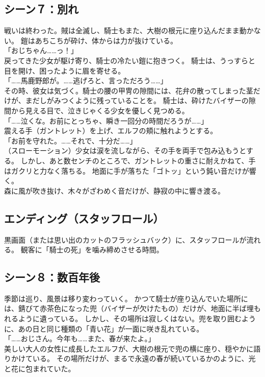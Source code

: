 \subsection{シーン７：別れ}
戦いは終わった。賊は全滅し、騎士もまた、大樹の根元に座り込んだまま動かない。
鎧はあちこちが砕け、体からは力が抜けている。
\\「おじちゃん……っ！」\\
戻ってきた少女が駆け寄り、騎士の冷たい鎧に抱きつく。
騎士は、うっすらと目を開け、困ったように眉を寄せる。
\\「……馬鹿野郎が。……逃げろと、言っただろう……」\\
その時、彼女は気づく。騎士の腰の甲冑の隙間には、花弁の散ってしまった茎だけが、まだしがみつくように残っていることを。
騎士は、砕けたバイザーの隙間から見える目で、泣きじゃくる少女を優しく見つめる。
\\「……泣くな。お前にとっちゃ、瞬き一回分の時間だろうが……」\\
震える手（ガントレット）を上げ、エルフの頬に触れようとする。
\\「お前を守れた。……それで、十分だ……」\\
（スローモーション）少女は涙を流しながら、その手を両手で包み込もうとする。
しかし、あと数センチのところで、ガントレットの重さに耐えかねて、手はガクリと力なく落ちる。
地面に手が落ちた「ゴトッ」という鈍い音だけが響く。\\
森に風が吹き抜け、木々がざわめく音だけが、静寂の中に響き渡る。

\subsection{エンディング（スタッフロール）}
黒画面（または思い出のカットのフラッシュバック）に、スタッフロールが流れる。
観客に「騎士の死」を噛み締めさせる時間。

\subsection{シーン８：数百年後}
季節は巡り、風景は移り変わっていく。
かつて騎士が座り込んでいた場所には、錆びて赤茶色になった兜（バイザーが欠けたもの）だけが、地面に半ば埋もれるように遺っている。
しかし、その場所は寂しくはない。兜を取り囲むように、あの日と同じ種類の「青い花」が一面に咲き乱れている。
\\「……おじさん。今年も……また、春が来たよ。」\\
美しい大人の女性に成長したエルフが、大樹の根元で兜の横に座り、穏やかに語りかけている。
その場所だけが、まるで永遠の春が続いているかのように、光と花に包まれていた。

